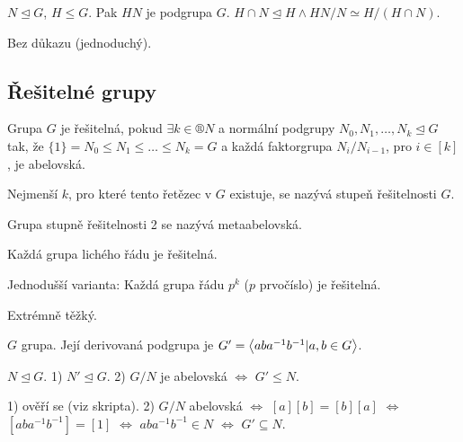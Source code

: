 \documentclass[12pt]{article}                   %
\begin{document}
        \begin{tvrzeni}
            $N \trianglelefteq G$, $H ≤ G$. Pak $HN$ je podgrupa $G$. $H \cap N \trianglelefteq H \land HN/N \simeq H/(H \cap N)$.

            \begin{dukazin}
                Bez důkazu (jednoduchý).
            \end{dukazin}
        \end{tvrzeni}

    \subsection{Řešitelné grupy}
        \begin{definice}
            Grupa $G$ je řešitelná, pokud $\exists k \in ®N$ a normální podgrupy $N_0, N_1, …, N_k \trianglelefteq G$ tak, že $\{1\} = N_0 ≤ N_1 ≤ … ≤ N_k = G$ a každá faktorgrupa $N_i / N_{i-1}$, pro $i \in [k]$, je abelovská.

            Nejmenší $k$, pro které tento řetězec v $G$ existuje, se nazývá stupeň řešitelnosti $G$.
        \end{definice}

        \begin{definice}
            Grupa stupně řešitelnosti 2 se nazývá metaabelovská.
        \end{definice}

        \begin{veta}
            Každá grupa lichého řádu je řešitelná.

            Jednodušší varianta: Každá grupa řádu $p^k$ ($p$ prvočíslo) je řešitelná.

            \begin{dukazin}
                Extrémně těžký.
            \end{dukazin}
        \end{veta}

        \begin{definice}
            $G$ grupa. Její derivovaná podgrupa je $G' = \left\langle aba^{-1}b^{-1} | a, b \in G\right\rangle$.
        \end{definice}

        \begin{lemma}
            $N \trianglelefteq G$. 1) $N' \trianglelefteq G$. 2) $G/N$ je abelovská $\Leftrightarrow$ $G' ≤ N$.

            \begin{dukazin}
                1) ověří se (viz skripta). 2) $G/N$ abelovská $\Leftrightarrow$ $[a][b] = [b][a]$ $\Leftrightarrow$ $[aba^{-1}b^{-1}] = [1]$ $\Leftrightarrow$ $aba^{-1}b^{-1} \in N$ $\Leftrightarrow$ $G' \subseteq N$.
            \end{dukazin}
        \end{lemma}
\end{document}
